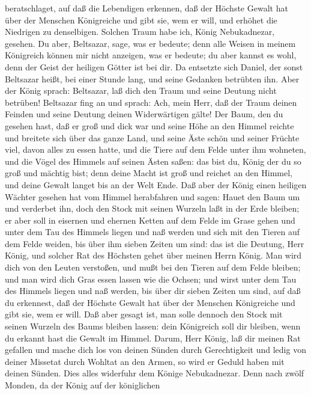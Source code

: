 beratschlaget, auf daß die Lebendigen erkennen, daß der Höchste Gewalt
hat über der Menschen Königreiche und gibt sie, wem er will, und erhöhet
die Niedrigen zu denselbigen.  Solchen Traum habe ich,
König Nebukadnezar, gesehen. Du aber, Beltsazar, sage, was er bedeute;
denn alle Weisen in meinem Königreich können mir nicht anzeigen, was er
bedeute; du aber kannst es wohl, denn der Geist der heiligen Götter ist
bei dir.  Da entsetzte sich Daniel, der sonst Beltsazar
heißt, bei einer Stunde lang, und seine Gedanken betrübten ihn. Aber der
König sprach: Beltsazar, laß dich den Traum und seine Deutung nicht
betrüben! Beltsazar fing an und sprach: Ach, mein Herr, daß der Traum
deinen Feinden und seine Deutung deinen Widerwärtigen gälte!
 Der Baum, den du gesehen hast, daß er groß und dick war
und seine Höhe an den Himmel reichte und breitete sich über das ganze
Land,  und seine Äste schön und seiner Früchte viel, davon
alles zu essen hatte, und die Tiere auf dem Felde unter ihm wohneten,
und die Vögel des Himmels auf seinen Ästen saßen:  das bist
du, König der du so groß und mächtig bist; denn deine Macht ist groß und
reichet an den Himmel, und deine Gewalt langet bis an der Welt Ende.
 Daß aber der König einen heiligen Wächter gesehen hat vom
Himmel herabfahren und sagen: Hauet den Baum um und verderbet ihn, doch
den Stock mit seinen Wurzeln laßt in der Erde bleiben; er aber soll in
eisernen und ehernen Ketten auf dem Felde im Grase gehen und unter dem
Tau des Himmels liegen und naß werden und sich mit den Tieren auf dem
Felde weiden, bis über ihm sieben Zeiten um sind:  das ist
die Deutung, Herr König, und solcher Rat des Höchsten gehet über meinen
Herrn König.  Man wird dich von den Leuten verstoßen, und
mußt bei den Tieren auf dem Felde bleiben; und man wird dich Gras essen
lassen wie die Ochsen; und wirst unter dem Tau des Himmels liegen und
naß werden, bis über dir sieben Zeiten um sind, auf daß du erkennest,
daß der Höchste Gewalt hat über der Menschen Königreiche und gibt sie,
wem er will.  Daß aber gesagt ist, man solle dennoch den
Stock mit seinen Wurzeln des Baums bleiben lassen: dein Königreich soll
dir bleiben, wenn du erkannt hast die Gewalt im Himmel. 
Darum, Herr König, laß dir meinen Rat gefallen und mache dich los von
deinen Sünden durch Gerechtigkeit und ledig von deiner Missetat durch
Wohltat an den Armen, so wird er Geduld haben mit deinen Sünden.
 Dies alles widerfuhr dem Könige Nebukadnezar.
 Denn nach zwölf Monden, da der König auf der königlichen
